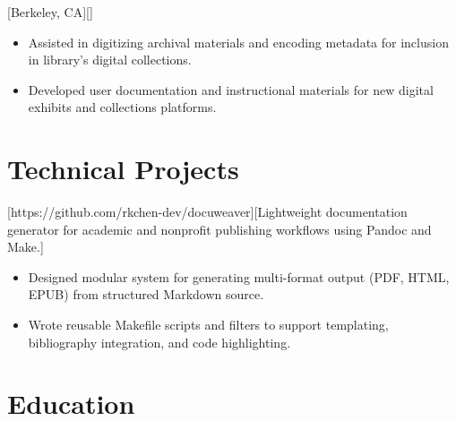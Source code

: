 \documentclass{stitched}
\begin{document}
        [Berkeley, CA][]
        \begin{itemize}
  \item Assisted in digitizing archival materials and encoding metadata for inclusion in library's digital collections.
  \item Developed user documentation and instructional materials for new digital exhibits and collections platforms.
\end{itemize}

\section*{Technical Projects}

        [https://github.com/rkchen-dev/docuweaver][Lightweight documentation generator for academic and nonprofit publishing workflows using Pandoc and Make.]
        \begin{itemize}
  \item Designed modular system for generating multi-format output (PDF, HTML, EPUB) from structured Markdown source.
  \item Wrote reusable Makefile scripts and filters to support templating, bibliography integration, and code highlighting.
\end{itemize}

\section*{Education}

\end{document}
